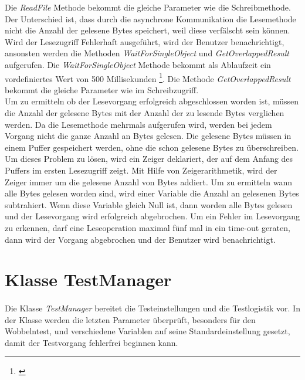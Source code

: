 Die \textit{ReadFile} Methode bekommt die gleiche Parameter wie die Schreibmethode. Der Unterschied ist, dass durch die asynchrone Kommunikation die Lesemethode nicht die Anzahl der gelesene Bytes speichert, weil diese verfälscht sein können. Wird der Lesezugriff Fehlerhaft ausgeführt, wird der Benutzer benachrichtigt, ansonsten werden die Methoden \textit{WaitForSingleObject} und \textit{GetOverlappedResult} aufgerufen. Die \textit{WaitForSingleObject} Methode bekommt als Ablaufzeit ein vordefiniertes Wert von 500 Millisekunden \footnote{\cite{SerialCommunications}}. Die Methode \textit{GetOverlappedResult} bekommt die gleiche Parameter wie im Schreibzugriff.\\

Um zu ermitteln ob der Lesevorgang erfolgreich abgeschlossen worden ist, müssen die Anzahl der gelesene Bytes mit der Anzahl der zu lesende Bytes verglichen werden. Da die Lesemethode mehrmals aufgerufen wird, werden bei jedem Vorgang nicht die ganze Anzahl an Bytes gelesen. Die gelesene Bytes müssen in einem Puffer gespeichert werden, ohne die schon gelesene Bytes zu überschreiben. Um dieses Problem zu lösen, wird ein Zeiger deklariert, der auf dem Anfang des Puffers im ersten Lesezugriff zeigt. Mit Hilfe von Zeigerarithmetik, wird der Zeiger immer um die gelesene Anzahl von Bytes addiert. Um zu ermitteln wann alle Bytes gelesen worden sind, wird einer Variable die Anzahl an gelesenen Bytes subtrahiert. Wenn diese Variable gleich Null ist, dann worden alle Bytes gelesen und der Lesevorgang wird erfolgreich abgebrochen. Um ein Fehler im Lesevorgang zu erkennen, darf eine Leseoperation maximal fünf mal in ein time-out geraten, dann wird der Vorgang abgebrochen und der Benutzer wird benachrichtigt.



\newpage


\section{Klasse TestManager}
\paragraph{}
Die Klasse \textit{TestManager} bereitet die Testeinstellungen und die Testlogistik vor. In der Klasse werden die letzten Parameter überprüft, besonders für den Wobbelntest, und verschiedene Variablen auf seine Standardeinstellung gesetzt, damit der Testvorgang fehlerfrei beginnen kann.


